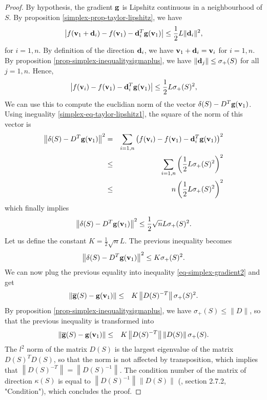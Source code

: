 \begin{proof}
By hypothesis, the gradient $\mathbf{g}$ is Lipshitz continuous in 
a neighbourhood of $S$. By proposition \ref{simplex-prop-taylor-lipshitz},
we have 
\begin{eqnarray}
\left| f(\mathbf{v}_1 + \mathbf{d}_i) - f(\mathbf{v}_1) - \mathbf{d}_i^T \mathbf{g}(\mathbf{v}_1) \right| \leq \frac{1}{2} L \|\mathbf{d}_i\|^2,
\end{eqnarray}
for $i=1,n$.
By definition of the direction $\mathbf{d}_i$, we have $\mathbf{v}_1 + \mathbf{d}_i = \mathbf{v}_i$ for 
$i = 1,n$. By proposition \ref{prop-simplex-inequalitysigmaplus},
we have $\|\mathbf{d}_j\| \leq \sigma_+(S)$ for all $j=1,n$.
Hence, 
\begin{eqnarray}
\label{simplex-eq-taylor-lipshitz1}
\left| f(\mathbf{v}_i) - f(\mathbf{v}_1) - \mathbf{d}_i^T \mathbf{g}(\mathbf{v}_1) \right| \leq \frac{1}{2} L \sigma_+(S)^2,
\end{eqnarray}
We can use this to compute the euclidian norm of the 
vector $\delta(S) - D^T \mathbf{g}(\mathbf{v}_1)$. Using ineguality \ref{simplex-eq-taylor-lipshitz1},
the square of the norm of this vector is 
\begin{eqnarray}
\left\| \delta(S) - D^T \mathbf{g}(\mathbf{v}_1) \right\|^2 
& = & \sum_{i=1,n} \left( f(\mathbf{v}_i) - f(\mathbf{v}_1) - \mathbf{d}_i^T \mathbf{g}(\mathbf{v}_1)\right)^2 \\
&\leq & \sum_{i=1,n} \left( \frac{1}{2} L \sigma_+(S)^2 \right)^2\\
&\leq & n \left( \frac{1}{2} L \sigma_+(S)^2 \right)^2
\end{eqnarray}
which finally implies
\begin{eqnarray}
\left\| \delta(S) - D^T \mathbf{g}(\mathbf{v}_1) \right\|^2 
\leq \frac{1}{2} \sqrt{n} L \sigma_+(S)^2.
\end{eqnarray}
Let us define the constant $K = \frac{1}{2} \sqrt{n} L$.
The previous inequality becomes
\begin{eqnarray}
\left\| \delta(S) - D^T \mathbf{g}(\mathbf{v}_1) \right\|^2 
\leq K \sigma_+(S)^2.
\end{eqnarray}
We can now plug the previous equality into inequality \ref{eq-simplex-gradient2}
and get
\begin{eqnarray}
\left\| \overline{\mathbf{g}}(S) - \mathbf{g}(\mathbf{v}_1) \right\| 
&\leq& K  \left\| D(S)^{-T} \right\| \sigma_+(S)^2.
\end{eqnarray}
By proposition \ref{prop-simplex-inequalitysigmaplus},
we have $\sigma_+(S) \leq \|D\|$, so that the previous inequality
is transformed into
\begin{eqnarray}
\left\| \overline{\mathbf{g}}(S) - \mathbf{g}(\mathbf{v}_1) \right\| 
&\leq& K  \left\| D(S)^{-T} \right\| \left\| D(S) \right\| \sigma_+(S).
\end{eqnarray}
The $l^2$ norm of the matrix $D(S)$ is the largest eigenvalue 
of the matrix $D(S)^T D(S)$, 
so that the norm is not affected by transposition, which implies that
$\left\| D(S)^{-T} \right\| = \left\| D(S)^{-1} \right\|$. 
The condition number of the matrix of direction $\kappa(S)$
is equal to $\left\| D(S)^{-1} \right\| \left\| D(S) \right\|$
(\cite{citeulike:2122238}, section 2.7.2, "Condition"),
which concludes the proof.
\end{proof}

